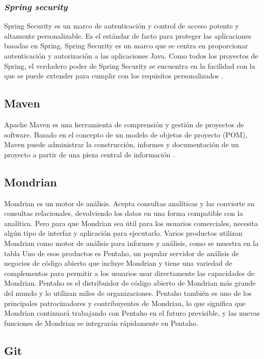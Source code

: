 \begin{spacing}{1.5}
		\subsubsection{\textit{Spring security}}
			Spring Security es un marco de autenticación y control de acceso potente y altamente personalizable. Es el estándar de facto para proteger las aplicaciones basadas en Spring.
			Spring Security es un marco que se centra en proporcionar autenticación y autorización a las aplicaciones Java. Como todos los proyectos de Spring, el verdadero poder de Spring Security se encuentra en la facilidad con la que se puede extender para cumplir con los requisitos personalizados \cite{chap2_spring_security}.
	\subsection{Maven}
		Apache Maven es una herramienta de comprensión y gestión de proyectos de software. Basado en el concepto de un modelo de objetos de proyecto (POM), Maven puede administrar la construcción, informes y documentación de un proyecto a partir de una pieza central de información \cite{chap2_maven}.
	\subsection{Mondrian}
			Mondrian es un motor de análisis. Acepta consultas analíticas y las convierte en consultas relacionales, devolviendo los datos en una forma compatible con la analítica. Pero para que Mondrian sea útil para los usuarios comerciales, necesita algún tipo de interfaz y aplicación para ejecutarlo.
			Varios productos utilizan Mondrian como motor de análisis para informes y análisis, como se muestra en la tabla  Uno de esos productos es Pentaho, un popular servidor de análisis de negocios de código abierto que incluye Mondrian y tiene una variedad de complementos para permitir a los usuarios usar directamente las capacidades de Mondrian. Pentaho es el distribuidor de código abierto de Mondrian más grande del mundo y lo utilizan miles de organizaciones. Pentaho también es uno de los principales patrocinadores y contribuyentes de Mondrian, lo que significa que Mondrian continuará trabajando con Pentaho en el futuro previsible, y las nuevas funciones de Mondrian se integrarán rápidamente en Pentaho.

	\subsection{Git}
			\lipsum[1-2]

\end{spacing}
